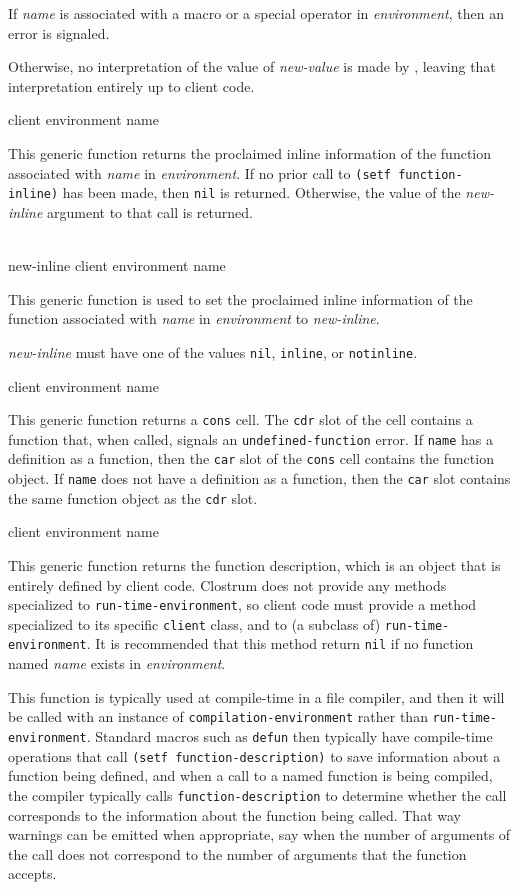 If \textit{name} is associated with a macro or a special
operator in \textit{environment}, then an error is signaled.

Otherwise, no interpretation of the value of \textit{new-value} is
made by \sysname{}, leaving that interpretation entirely up to client
code.

 {client environment name}

This generic function returns the proclaimed inline information of the
function associated with \textit{name} in \textit{environment}.  If no
prior call to \texttt{(setf function-inline)} has been made, then
\texttt{nil} is returned.  Otherwise, the value of the
\textit{new-inline} argument to that call is returned.

\\
{new-inline client environment name}

This generic function is used to set the proclaimed inline information
of the function associated with \textit{name} in
\textit{environment} to \textit{new-inline}.

\textit{new-inline} must have one of the values \texttt{nil},
\texttt{inline}, or \texttt{notinline}.

 {client environment name}

This generic function returns a \texttt{cons} cell.  The \texttt{cdr}
slot of the cell contains a function that, when called, signals an
\texttt{undefined-function} error.  If \texttt{name} has a
definition as a function, then the \texttt{car} slot of the \texttt{cons}
cell contains the function object.  If \texttt{name} does not
have a definition as a function, then the \texttt{car} slot contains
the same function object as the \texttt{cdr} slot.

 {client environment name}

This generic function returns the function description, which is an
object that is entirely defined by client code.  Clostrum does not
provide any methods specialized to \texttt{run-time-environment}, so
client code must provide a method specialized to its specific
\texttt{client} class, and to (a subclass of)
\texttt{run-time-environment}.  It is recommended that this method
return \texttt{nil} if no function named \textit{name} exists
in \textit{environment}.

This function is typically used at compile-time in a file compiler,
and then it will be called with an instance of
\texttt{compilation-environment} rather than
\texttt{run-time-environment}.  Standard macros such as \texttt{defun}
then typically have compile-time operations that call \texttt{(setf
  function-description)} to save information about a function being
defined, and when a call to a named function is being compiled, the
compiler typically calls \texttt{function-description} to determine
whether the call corresponds to the information about the function
being called.  That way warnings can be emitted when appropriate, say
when the number of arguments of the call does not correspond to the
number of arguments that the function accepts.

